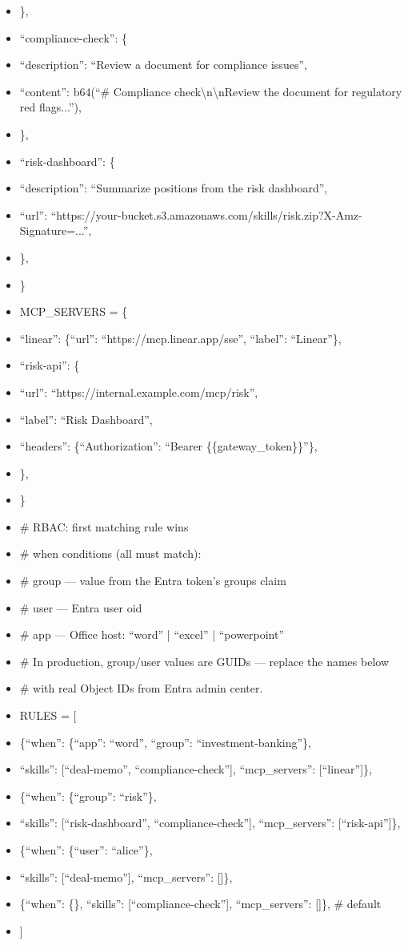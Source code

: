 \documentclass[11pt]{article}
\begin{document}
\begin{itemize}[leftmargin=*,itemsep=2pt,topsep=2pt]
\item {} \},
\item {} ``compliance-check'': \{
\item {} ``description'': ``Review a document for compliance issues'',
\item {} ``content'': b64(``\# Compliance check\textbackslash{}n\textbackslash{}nReview the document for regulatory red flags...''),
\item {} \},
\item {} ``risk-dashboard'': \{
\item {} ``description'': ``Summarize positions from the risk dashboard'',
\item {} ``url'': ``https://your-bucket.s3.amazonaws.com/skills/risk.zip?X-Amz-Signature=...'',
\item {} \},
\item {} \}
\item {} MCP\_\allowbreak{}SERVERS = \{
\item {} ``linear'': \{``url'': ``https://mcp.linear.app/sse'', ``label'': ``Linear''\},
\item {} ``risk-api'': \{
\item {} ``url'': ``https://internal.example.com/mcp/risk'',
\item {} ``label'': ``Risk Dashboard'',
\item {} ``headers'': \{``Authorization'': ``Bearer \{\{gateway\_\allowbreak{}token\}\}''\},
\item {} \},
\item {} \}
\item {} \# RBAC: first matching rule wins
\item {} \# when conditions (all must match):
\item {} \# group — value from the Entra token's groups claim
\item {} \# user — Entra user oid
\item {} \# app — Office host: ``word'' | ``excel'' | ``powerpoint''
\item {} \# In production, group/user values are GUIDs — replace the names below
\item {} \# with real Object IDs from Entra admin center.
\item {} RULES = [
\item {} \{``when'': \{``app'': ``word'', ``group'': ``investment-banking''\},
\item {} ``skills'': [``deal-memo'', ``compliance-check''], ``mcp\_\allowbreak{}servers'': [``linear'']\},
\item {} \{``when'': \{``group'': ``risk''\},
\item {} ``skills'': [``risk-dashboard'', ``compliance-check''], ``mcp\_\allowbreak{}servers'': [``risk-api'']\},
\item {} \{``when'': \{``user'': ``alice''\},
\item {} ``skills'': [``deal-memo''], ``mcp\_\allowbreak{}servers'': []\},
\item {} \{``when'': \{\}, ``skills'': [``compliance-check''], ``mcp\_\allowbreak{}servers'': []\}, \# default
\item {} ]
\end{itemize}
\end{document}
